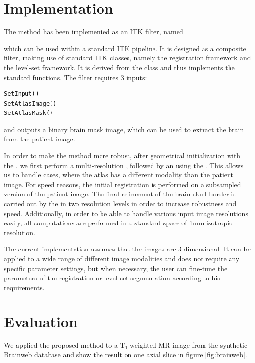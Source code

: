\documentclass{InsightArticle}
\begin{document}
\newpage

\section{Implementation}

The method has been implemented as an ITK filter, named 


which can be used within a standard ITK pipeline. It is designed as a composite filter, making use of standard ITK classes, namely the registration framework and the level-set framework. It is derived from the  class and thus implements the standard functions. The filter requires 3 inputs: 
\small
\begin{verbatim}
SetInput()
SetAtlasImage()
SetAtlasMask()
\end{verbatim}
\normalsize
and outputs a binary brain mask image, which can be used to extract the brain from the patient image.

In order to make the method more robust, after geometrical initialization with the , we first perform a multi-resolution , followed by an  using the . This allows us to handle cases, where the atlas has a different modality than the patient image. For speed reasons, the initial registration is performed on a subsampled version of the patient image. The final refinement of the brain-skull border is carried out by the  in two resolution levels in order to increase robustness and speed. Additionally, in order to be able to handle various input image resolutions easily, all computations are performed in a standard space of 1mm isotropic resolution.

The current implementation assumes that the images are 3-dimensional. It can be applied to a wide range of different image modalities and does not require any specific parameter settings, but when necessary, the user can fine-tune the parameters of the registration or level-set segmentation according to his requirements.


\section{Evaluation}

We applied the proposed method to a $\mathrm{T_1}$-weighted MR image from the synthetic Brainweb database \cite{Cocosco1997} and show the result on one axial slice in figure \ref{fig:brainweb}.
\end{document}
